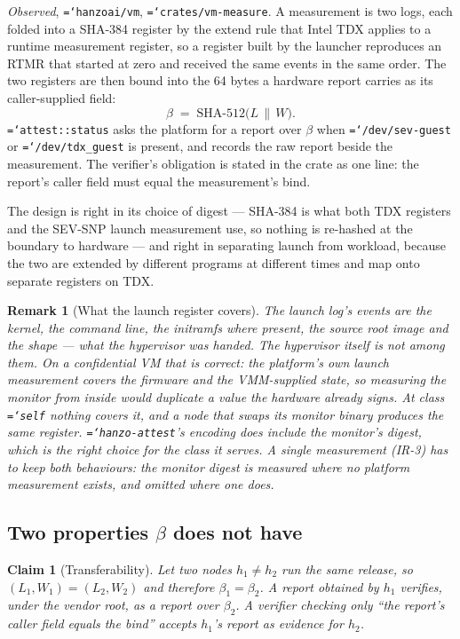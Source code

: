 \documentclass[11pt,a4paper]{article}
\newtheorem{claim}[definition]{Claim}
\newtheorem{remark}[definition]{Remark}
\newcommand{\code}[1]{\texttt{\hyphenchar\font=`\-\relax #1}}
\newcommand{\sha}[1]{\mathrm{SHA\text{-}#1}}
\begin{document}
\emph{Observed}, \code{hanzoai/vm}, \code{crates/vm-measure}. A measurement is two
logs, each folded into a SHA-384 register by the extend rule that Intel TDX
applies to a runtime measurement register, so a register built by the launcher
reproduces an RTMR that started at zero and received the same events in the same
order. The two registers are then bound into the 64 bytes a hardware report
carries as its caller-supplied field:
\[
\beta \;=\; \sha{512}\bigl(L \,\|\, W\bigr).
\]
\code{attest::status} asks the platform for a report over $\beta$ when
\code{/dev/sev-guest} or \code{/dev/tdx\_guest} is present, and records the raw
report beside the measurement. The verifier's obligation is stated in the crate as
one line: the report's caller field must equal the measurement's bind.

The design is right in its choice of digest --- SHA-384 is what both TDX registers
and the SEV-SNP launch measurement use, so nothing is re-hashed at the boundary to
hardware --- and right in separating launch from workload, because the two are
extended by different programs at different times and map onto separate registers
on TDX.

\begin{remark}[What the launch register covers]
The launch log's events are the kernel, the command line, the initramfs where
present, the source root image and the shape --- what the hypervisor was handed.
The hypervisor itself is not among them. On a confidential VM that is correct: the
platform's own launch measurement covers the firmware and the VMM-supplied state,
so measuring the monitor from inside would duplicate a value the hardware already
signs. At class \code{self} nothing covers it, and a node that swaps its monitor
binary produces the same register. \code{hanzo-attest}'s encoding does include the
monitor's digest, which is the right choice for the class it serves. A single
measurement (IR-3) has to keep both behaviours: the monitor digest is measured
where no platform measurement exists, and omitted where one does.
\end{remark}

\subsection{Two properties $\beta$ does not have}

\begin{claim}[Transferability]\label{cl:transfer}
Let two nodes $h_1 \ne h_2$ run the same release, so
$(L_1, W_1) = (L_2, W_2)$ and therefore $\beta_1 = \beta_2$. A report obtained by
$h_1$ verifies, under the vendor root, as a report over $\beta_2$. A verifier
checking only ``the report's caller field equals the bind'' accepts $h_1$'s report
as evidence for $h_2$.
\end{claim}
\end{document}
